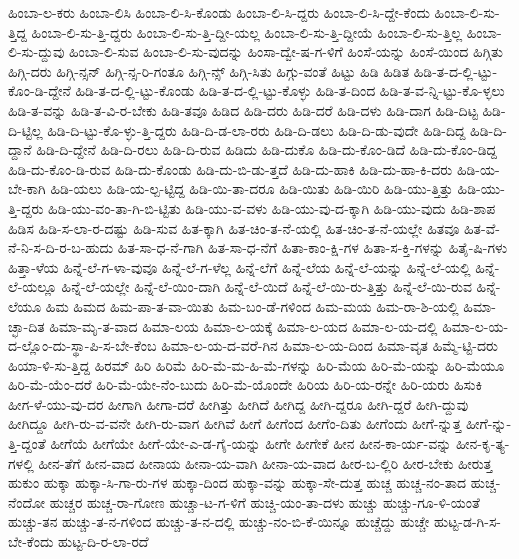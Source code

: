 {ಹಿಂಬಾ-ಲ-ಕರು
ಹಿಂಬಾ-ಲಿಸಿ
ಹಿಂಬಾ-ಲಿ-ಸಿ-ಕೊಂಡು
ಹಿಂಬಾ-ಲಿ-ಸಿ-ದ್ದರು
ಹಿಂಬಾ-ಲಿ-ಸಿ-ದ್ದೇ-ಕೆಂದು
ಹಿಂಬಾ-ಲಿ-ಸು-ತ್ತಿದ್ದ
ಹಿಂಬಾ-ಲಿ-ಸು-ತ್ತಿ-ದ್ದರು
ಹಿಂಬಾ-ಲಿ-ಸು-ತ್ತಿ-ದ್ದೀ-ಯಲ್ಲ
ಹಿಂಬಾ-ಲಿ-ಸು-ತ್ತಿ-ದ್ದೀಯೆ
ಹಿಂಬಾ-ಲಿ-ಸು-ತ್ತಿಲ್ಲ
ಹಿಂಬಾ-ಲಿ-ಸು-ದ್ದುವು
ಹಿಂಬಾ-ಲಿ-ಸುವ
ಹಿಂಬಾ-ಲಿ-ಸು-ವುದನ್ನು
ಹಿಂಸಾ-ದ್ವೇ-ಷ-ಗ-ಳಿಗೆ
ಹಿಂಸೆ-ಯನ್ನು
ಹಿಂಸೆ-ಯಿಂದ
ಹಿಗ್ಗಿತು
ಹಿಗ್ಗಿ-ದರು
ಹಿಗ್ಗಿ-ನ್ಸನ್
ಹಿಗ್ಗಿ-ನ್ಸ-ರಿ-ಗಂತೂ
ಹಿಗ್ಗಿ-ನ್ಸ್
ಹಿಗ್ಗಿ-ಸಿತು
ಹಿಗ್ಗು-ವಂತೆ
ಹಿಟ್ಟು
ಹಿಡಿ
ಹಿಡಿತ
ಹಿಡಿ-ತ-ದ-ಲ್ಲಿ-ಟ್ಟು-ಕೊಂ-ಡಿ-ದ್ದೇನೆ
ಹಿಡಿ-ತ-ದ-ಲ್ಲಿ-ಟ್ಟು-ಕೊಂಡು
ಹಿಡಿ-ತ-ದ-ಲ್ಲಿ-ಟ್ಟು-ಕೊಳ್ಳು
ಹಿಡಿ-ತ-ದಿಂದ
ಹಿಡಿ-ತ-ವ-ನ್ನಿ-ಟ್ಟು-ಕೊ-ಳ್ಳಲು
ಹಿಡಿ-ತ-ವನ್ನು
ಹಿಡಿ-ತ-ವಿ-ರ-ಬೇಕು
ಹಿಡಿ-ತವೂ
ಹಿಡಿದ
ಹಿಡಿ-ದರು
ಹಿಡಿ-ದರೆ
ಹಿಡಿ-ದಳು
ಹಿಡಿ-ದಾಗ
ಹಿಡಿ-ದಿಟ್ಟ
ಹಿಡಿ-ದಿ-ಟ್ಟಿಲ್ಲ
ಹಿಡಿ-ದಿ-ಟ್ಟು-ಕೊ-ಳ್ಳು-ತ್ತಿ-ದ್ದರು
ಹಿಡಿ-ದಿ-ಡ-ಲಾ-ರರು
ಹಿಡಿ-ದಿ-ಡಲು
ಹಿಡಿ-ದಿ-ಡು-ವುದೇ
ಹಿಡಿ-ದಿದ್ದ
ಹಿಡಿ-ದಿ-ದ್ದಾನೆ
ಹಿಡಿ-ದಿ-ದ್ದೇನೆ
ಹಿಡಿ-ದಿ-ರಲು
ಹಿಡಿ-ದಿ-ರುವ
ಹಿಡಿದು
ಹಿಡಿ-ದುಕೊ
ಹಿಡಿ-ದು-ಕೊಂ-ಡಿದೆ
ಹಿಡಿ-ದು-ಕೊಂ-ಡಿದ್ದ
ಹಿಡಿ-ದು-ಕೊಂ-ಡಿ-ರುವ
ಹಿಡಿ-ದು-ಕೊಂಡು
ಹಿಡಿ-ದು-ಬಿ-ಡು-ತ್ತದೆ
ಹಿಡಿ-ದು-ಹಾಕಿ
ಹಿಡಿ-ದು-ಹಾ-ಕಿ-ದರು
ಹಿಡಿ-ಯ-ಬೇ-ಕಾಗಿ
ಹಿಡಿ-ಯಲು
ಹಿಡಿ-ಯ-ಲ್ಪ-ಟ್ಟಿದ್ದ
ಹಿಡಿ-ಯಿ-ತಾ-ದರೂ
ಹಿಡಿ-ಯಿತು
ಹಿಡಿ-ಯಿರಿ
ಹಿಡಿ-ಯು-ತ್ತಿತ್ತು
ಹಿಡಿ-ಯು-ತ್ತಿ-ದ್ದರು
ಹಿಡಿ-ಯು-ವಂ-ತಾ-ಗಿ-ಬಿ-ಟ್ಟಿತು
ಹಿಡಿ-ಯು-ವ-ವಳು
ಹಿಡಿ-ಯು-ವು-ದ-ಕ್ಕಾಗಿ
ಹಿಡಿ-ಯು-ವುದು
ಹಿಡಿ-ಶಾಪ
ಹಿಡಿಸ
ಹಿಡಿ-ಸ-ಲಾ-ರ-ದಷ್ಟು
ಹಿಡಿ-ಸುವ
ಹಿತ-ಕ್ಕಾಗಿ
ಹಿತ-ಚಿಂ-ತ-ನೆ-ಯಲ್ಲಿ
ಹಿತ-ಚಿಂ-ತ-ನೆ-ಯಲ್ಲೇ
ಹಿತವೂ
ಹಿತ-ವೆ-ನೆ-ನಿ-ಸ-ದಿ-ರ-ಬ-ಹುದು
ಹಿತ-ಸಾ-ಧ-ನೆ-ಗಾಗಿ
ಹಿತ-ಸಾ-ಧ-ನೆಗೆ
ಹಿತಾ-ಕಾಂ-ಕ್ಷಿ-ಗಳ
ಹಿತಾ-ಸ-ಕ್ತಿ-ಗಳನ್ನು
ಹಿತೈ-ಷಿ-ಗಳು
ಹಿತ್ತಾ-ಳೆಯ
ಹಿನ್ನೆ-ಲೆ-ಗ-ಳಾ-ವುವೂ
ಹಿನ್ನೆ-ಲೆ-ಗ-ಳೆಲ್ಲ
ಹಿನ್ನೆ-ಲೆಗೆ
ಹಿನ್ನೆ-ಲೆಯ
ಹಿನ್ನೆ-ಲೆ-ಯನ್ನು
ಹಿನ್ನೆ-ಲೆ-ಯಲ್ಲಿ
ಹಿನ್ನೆ-ಲೆ-ಯಲ್ಲೂ
ಹಿನ್ನೆ-ಲೆ-ಯಲ್ಲೇ
ಹಿನ್ನೆ-ಲೆ-ಯಿಂ-ದಾಗಿ
ಹಿನ್ನೆ-ಲೆ-ಯಿದೆ
ಹಿನ್ನೆ-ಲೆ-ಯಿ-ರು-ತ್ತಿತ್ತು
ಹಿನ್ನೆ-ಲೆ-ಯಿ-ರುವ
ಹಿನ್ನೆ-ಲೆಯೂ
ಹಿಮ
ಹಿಮದ
ಹಿಮ-ಪಾ-ತ-ವಾ-ಯಿತು
ಹಿಮ-ಬಂ-ಡೆ-ಗಳಿಂದ
ಹಿಮ-ಮಯ
ಹಿಮ-ರಾ-ಶಿ-ಯಲ್ಲಿ
ಹಿಮಾ-ಚ್ಛಾ-ದಿತ
ಹಿಮಾ-ಮೃ-ತ-ವಾದ
ಹಿಮಾ-ಲಯ
ಹಿಮಾ-ಲ-ಯಕ್ಕೆ
ಹಿಮಾ-ಲ-ಯದ
ಹಿಮಾ-ಲ-ಯ-ದಲ್ಲಿ
ಹಿಮಾ-ಲ-ಯ-ದ-ಲ್ಲೊಂ-ದು-ಸ್ಥಾ-ಪಿ-ಸ-ಬೇ-ಕೆಂಬ
ಹಿಮಾ-ಲ-ಯ-ದ-ವರೆ-ಗಿನ
ಹಿಮಾ-ಲ-ಯ-ದಿಂದ
ಹಿಮಾ-ವೃತ
ಹಿಮ್ಮೆ-ಟ್ಟಿ-ದರು
ಹಿಯಾ-ಳಿ-ಸು-ತ್ತಿದ್ದ
ಹಿರಮ್
ಹಿರಿ
ಹಿರಿಮೆ
ಹಿರಿ-ಮೆ-ಮ-ಹಿ-ಮೆ-ಗಳನ್ನು
ಹಿರಿ-ಮೆಯ
ಹಿರಿ-ಮೆ-ಯನ್ನು
ಹಿರಿ-ಮೆಯೂ
ಹಿರಿ-ಮೆ-ಯೆಂ-ದರೆ
ಹಿರಿ-ಮೆ-ಯೇ-ನೆಂ-ಬುದು
ಹಿರಿ-ಮೆ-ಯೊಂದೇ
ಹಿರಿಯ
ಹಿರಿ-ಯ-ರನ್ನೇ
ಹಿರಿ-ಯರು
ಹಿಸುಕಿ
ಹೀಗ-ಳೆ-ಯು-ವು-ದರ
ಹೀಗಾಗಿ
ಹೀಗಾ-ದರೆ
ಹೀಗಿತ್ತು
ಹೀಗಿದೆ
ಹೀಗಿದ್ದ
ಹೀಗಿ-ದ್ದರೂ
ಹೀಗಿ-ದ್ದರೆ
ಹೀಗಿ-ದ್ದುವು
ಹೀಗಿದ್ದೂ
ಹೀಗಿ-ರು-ವ-ವನೇ
ಹೀಗಿ-ರು-ವಾಗ
ಹೀಗಿವೆ
ಹೀಗೆ
ಹೀಗೆಂದ
ಹೀಗೆಂ-ದಿತು
ಹೀಗೆಂದು
ಹೀಗೆ-ನ್ನುತ್ತ
ಹೀಗೆ-ನ್ನು-ತ್ತಿ-ದ್ದಂತೆ
ಹೀಗೆಯೆ
ಹೀಗೆಯೇ
ಹೀಗೆ-ಯೇ-ಎ-ಡ-ಗೈ-ಯನ್ನು
ಹೀಗೇ
ಹೀಗೇಕೆ
ಹೀನ
ಹೀನ-ಕಾ-ರ್ಯ-ವನ್ನು
ಹೀನ-ಕೃ-ತ್ಯ-ಗಳಲ್ಲಿ
ಹೀನ-ತೆಗೆ
ಹೀನ-ವಾದ
ಹೀನಾಯ
ಹೀನಾ-ಯ-ವಾಗಿ
ಹೀನಾ-ಯ-ವಾದ
ಹೀರ-ಬ-ಲ್ಲಿರಿ
ಹೀರ-ಬೇಕು
ಹೀರುತ್ತ
ಹುಕುಂ
ಹುಕ್ಕಾ
ಹುಕ್ಕಾ-ಸಿ-ಗಾ-ರು-ಗಳ
ಹುಕ್ಕಾ-ದಿಂದ
ಹುಕ್ಕಾ-ವನ್ನು
ಹುಕ್ಕಾ-ಸೇ-ದುತ್ತ
ಹುಚ್ಚ
ಹುಚ್ಚ-ನಂ-ತಾದ
ಹುಚ್ಚ-ನೆಂದೋ
ಹುಚ್ಚರ
ಹುಚ್ಚ-ರಾ-ಗೋಣ
ಹುಚ್ಚಾ-ಟ-ಗ-ಳಿಗೆ
ಹುಚ್ಚಿ-ಯಂ-ತಾ-ದಳು
ಹುಚ್ಚು
ಹುಚ್ಚು-ಗೂ-ಳಿ-ಯಂತೆ
ಹುಚ್ಚು-ತನ
ಹುಚ್ಚು-ತ-ನ-ಗಳಿಂದ
ಹುಚ್ಚು-ತ-ನ-ದಲ್ಲಿ
ಹುಚ್ಚು-ನಂ-ಬಿ-ಕೆ-ಯಿನ್ನೂ
ಹುಚ್ಚೆದ್ದು
ಹುಚ್ಚೇ
ಹುಟ್ಟ-ಡ-ಗಿ-ಸ-ಬೇ-ಕೆಂದು
ಹುಟ್ಟ-ದಿ-ರ-ಲಾ-ರದೆ
}
